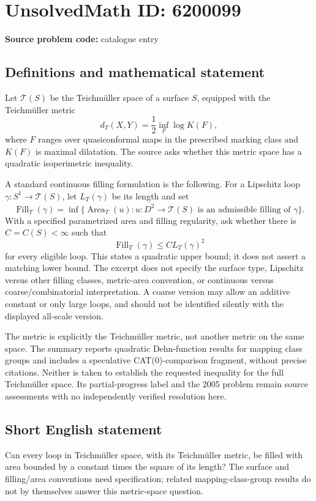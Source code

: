 \documentclass[11pt]{article}
\begin{document}
\section*{UnsolvedMath ID: 6200099}
\textbf{Source problem code:} catalogue entry
\subsection{Definitions and mathematical statement}
Let \(\mathcal T(S)\) be the Teichm\"uller space of a surface \(S\), equipped with the Teichm\"uller metric
\[
 d_T(X,Y)=\frac12\inf_F\log K(F),
\]
where \(F\) ranges over quasiconformal maps in the prescribed marking class and \(K(F)\) is maximal dilatation. The source asks whether this metric space has a quadratic isoperimetric inequality.

A standard continuous filling formulation is the following. For a Lipschitz loop \(\gamma:S^1\to\mathcal T(S)\), let \(L_T(\gamma)\) be its length and set
\[
 \operatorname{Fill}_T(\gamma)=\inf\{\operatorname{Area}_T(u):
 u:\overline{D^2}\to\mathcal T(S)\text{ is an admissible filling of }\gamma\}.
\]
With a specified parametrized area and filling regularity, ask whether there is \(C=C(S)<\infty\) such that
\[
 \operatorname{Fill}_T(\gamma)\le C L_T(\gamma)^2
\]
for every eligible loop. This states a quadratic upper bound; it does not assert a matching lower bound. The excerpt does not specify the surface type, Lipschitz versus other filling classes, metric-area convention, or continuous versus coarse/combinatorial interpretation. A coarse version may allow an additive constant or only large loops, and should not be identified silently with the displayed all-scale version.

The metric is explicitly the Teichm\"uller metric, not another metric on the same space. The summary reports quadratic Dehn-function results for mapping class groups and includes a speculative CAT(0)-comparison fragment, without precise citations. Neither is taken to establish the requested inequality for the full Teichm\"uller space. Its partial-progress label and the 2005 problem remain source assessments with no independently verified resolution here.
\subsection{Short English statement}
Can every loop in Teichm\"uller space, with its Teichm\"uller metric, be filled with area bounded by a constant times the square of its length? The surface and filling/area conventions need specification; related mapping-class-group results do not by themselves answer this metric-space question.
\end{document}
